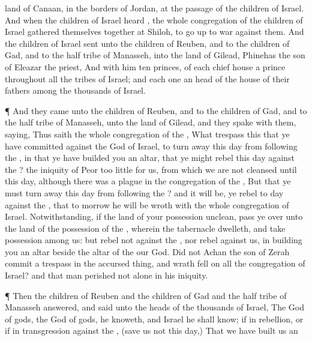 {land of
Canaan, in the
borders of
Jordan, at the
passage of the
children of
Israel.
And when the
children of
Israel
heard
{}, the whole
congregation of the
children of
Israel gathered themselves
together at
Shiloh, to go
up to
war against them.
And the
children of
Israel
sent unto the
children of
Reuben, and to the
children of
Gad, and to the
half
tribe of
Manasseh, into the
land of
Gilead,
Phinehas the
son of
Eleazar the
priest,
And with him
ten
princes, of
each
chief
house a
prince throughout all the
tribes of
Israel; and each
one
{} an
head of the
house of their
fathers among the
thousands of
Israel.
\par }{\PP {}¶ And they
came unto the
children of
Reuben, and to the
children of
Gad, and to the
half
tribe of
Manasseh, unto the
land of
Gilead, and they
spake with them,
saying,
Thus
saith the whole
congregation of the
{}, What
trespass
{} this that ye have
committed against the
God of
Israel, to turn
away this
day from
following the
{}, in that ye have
builded you an
altar, that ye might
rebel this
day against the
{}?
 the
iniquity of
Peor too
little for us, from which we are not
cleansed until this
day, although there was a
plague in the
congregation of the
{},
But that ye must turn
away this
day from
following the
{}? and it will be,
{} ye
rebel to
day against the
{}, that to
morrow he will be
wroth with the whole
congregation of
Israel.
Notwithstanding, if the
land of your
possession
{}
unclean,
{} pass ye
over unto the
land of the
possession of the
{}, wherein the
{}
tabernacle
dwelleth, and take
possession
among us: but
rebel not against the
{},
nor
rebel against us, in
building you an
altar
beside the
altar of the
{} our
God.
Did not
Achan the
son of
Zerah
commit a
trespass in the accursed
thing, and
wrath
fell on all the
congregation of
Israel? and that
man
perished not
alone in his
iniquity.
\par }{\PP {}¶ Then the
children of
Reuben and the
children of
Gad and the
half
tribe of
Manasseh
answered, and
said unto the
heads of the
thousands of
Israel,
The
{}
God of
gods, the
{}
God of
gods, he
knoweth, and
Israel he shall
know; if
{} in
rebellion, or if in
transgression against the
{}, (save us not this
day,)
That we have
built us an
}
